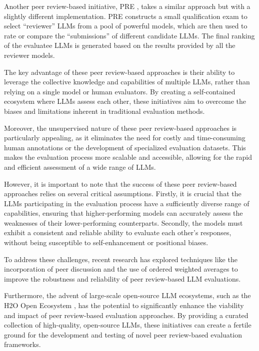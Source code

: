 \documentclass[11pt]{article}
\begin{document}
Another peer review-based initiative, PRE \cite{ref80}, takes a similar approach but with a slightly different implementation. PRE constructs a small qualification exam to select ``reviewer'' LLMs from a pool of powerful models, which are then used to rate or compare the ``submissions'' of different candidate LLMs. The final ranking of the evaluatee LLMs is generated based on the results provided by all the reviewer models.

The key advantage of these peer review-based approaches is their ability to leverage the collective knowledge and capabilities of multiple LLMs, rather than relying on a single model or human evaluators. By creating a self-contained ecosystem where LLMs assess each other, these initiatives aim to overcome the biases and limitations inherent in traditional evaluation methods.

Moreover, the unsupervised nature of these peer review-based approaches is particularly appealing, as it eliminates the need for costly and time-consuming human annotations or the development of specialized evaluation datasets. This makes the evaluation process more scalable and accessible, allowing for the rapid and efficient assessment of a wide range of LLMs.

However, it is important to note that the success of these peer review-based approaches relies on several critical assumptions. Firstly, it is crucial that the LLMs participating in the evaluation process have a sufficiently diverse range of capabilities, ensuring that higher-performing models can accurately assess the weaknesses of their lower-performing counterparts. Secondly, the models must exhibit a consistent and reliable ability to evaluate each other's responses, without being susceptible to self-enhancement or positional biases.

To address these challenges, recent research has explored techniques like the incorporation of peer discussion \cite{ref313} and the use of ordered weighted averages \cite{ref314} to improve the robustness and reliability of peer review-based LLM evaluations.

Furthermore, the advent of large-scale open-source LLM ecosystems, such as the H2O Open Ecosystem \cite{ref315}, has the potential to significantly enhance the viability and impact of peer review-based evaluation approaches. By providing a curated collection of high-quality, open-source LLMs, these initiatives can create a fertile ground for the development and testing of novel peer review-based evaluation frameworks.
\end{document}
